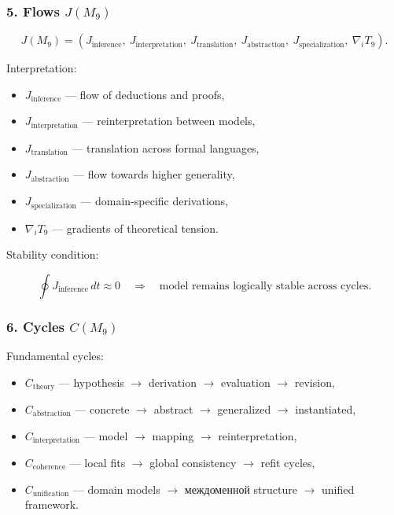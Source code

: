 \subsubsection*{5. Flows \texorpdfstring{$J(M_9)$}{J(M_9)}}

\[
J(M_9)=
(J_{\mathrm{inference}},\
J_{\mathrm{interpretation}},\
J_{\mathrm{translation}},\
J_{\mathrm{abstraction}},\
J_{\mathrm{specialization}},\
\nabla_i T_9).
\]

Interpretation:

\begin{itemize}
    \item $J_{\mathrm{inference}}$ — flow of deductions and proofs,
    \item $J_{\mathrm{interpretation}}$ — reinterpretation between models,
    \item $J_{\mathrm{translation}}$ — translation across formal languages,
    \item $J_{\mathrm{abstraction}}$ — flow towards higher generality,
    \item $J_{\mathrm{specialization}}$ — domain-specific derivations,
    \item $\nabla_i T_9$ — gradients of theoretical tension.
\end{itemize}

Stability condition:

\[
\oint J_{\mathrm{inference}}\,dt\approx 0
\quad\Rightarrow\quad
\text{model remains logically stable across cycles}.
\]

\subsubsection*{6. Cycles \texorpdfstring{$C(M_9)$}{C(M_9)}}

Fundamental cycles:

\begin{itemize}
    \item $C_{\mathrm{theory}}$ 
        — hypothesis $\to$ derivation $\to$ evaluation $\to$ revision,
    \item $C_{\mathrm{abstraction}}$ 
        — concrete $\to$ abstract $\to$ generalized $\to$ instantiated,
    \item $C_{\mathrm{interpretation}}$ 
        — model $\to$ mapping $\to$ reinterpretation,
    \item $C_{\mathrm{coherence}}$ 
        — local fits $\to$ global consistency $\to$ refit cycles,
    \item $C_{\mathrm{unification}}$ 
        — domain models $\to$ междоменной structure $\to$ unified framework.
\end{itemize}

